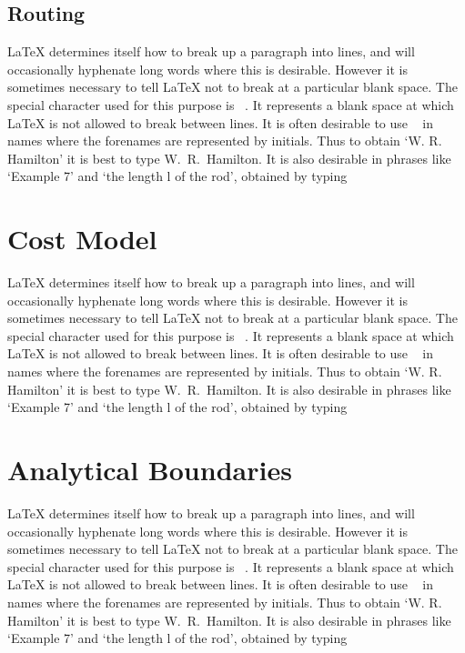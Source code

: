 \documentclass[12pt]{report}
\begin{document}
\subsection{Routing}

LaTeX determines itself how to break up a paragraph into lines, and will occasionally hyphenate long words where this is desirable. However it is sometimes necessary to tell LaTeX not to break at a particular blank space. The special character used for this purpose is ~. It represents a blank space at which LaTeX is not allowed to break between lines. It is often desirable to use ~ in names where the forenames are represented by initials. Thus to obtain `W. R. Hamilton' it is best to type W.~R.~Hamilton. It is also desirable in phrases like `Example 7' and `the length l of the rod', obtained by typing



\section{Cost Model}

LaTeX determines itself how to break up a paragraph into lines, and will occasionally hyphenate long words where this is desirable. However it is sometimes necessary to tell LaTeX not to break at a particular blank space. The special character used for this purpose is ~. It represents a blank space at which LaTeX is not allowed to break between lines. It is often desirable to use ~ in names where the forenames are represented by initials. Thus to obtain `W. R. Hamilton' it is best to type W.~R.~Hamilton. It is also desirable in phrases like `Example 7' and `the length l of the rod', obtained by typing



\section{Analytical Boundaries}

LaTeX determines itself how to break up a paragraph into lines, and will occasionally hyphenate long words where this is desirable. However it is sometimes necessary to tell LaTeX not to break at a particular blank space. The special character used for this purpose is ~. It represents a blank space at which LaTeX is not allowed to break between lines. It is often desirable to use ~ in names where the forenames are represented by initials. Thus to obtain `W. R. Hamilton' it is best to type W.~R.~Hamilton. It is also desirable in phrases like `Example 7' and `the length l of the rod', obtained by typing
\end{document}

